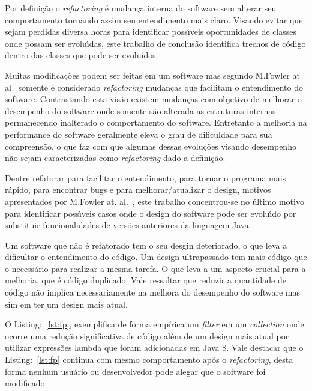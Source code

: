 Por defini\c{c}\~{a}o o \textit{refactoring} \'{e} mudan\c{c}a interna do software sem alterar seu comportamento tornando assim seu entendimento mais claro. Visando evitar que sejam perdidas diversa horas para identificar poss\'{\i}veis oportunidades de classes onde possam ser evolu\'{\i}das, este trabalho de conclus\~{a}o identifica trechos de c\'{o}digo dentro das classes que pode ser evolu\'{i}dos.

Muitas modifica\c{c}\~{o}es podem ser feitas em um software mas segundo M.Fowler at al~\cite{martinFowlerRafactoring} somente \'{e} considerado \textit{refactoring} mudan\c{c}as que facilitam o entendimento do software. Contrastando esta vis\~{a}o existem mudan\c{c}as com objetivo de melhorar o desempenho do software onde somente s\~{a}o alterada as estruturas internas permanecendo inalterado o comportamento do software. Entretanto a melhoria na performance do software geralmente eleva o grau de dificuldade para sua compreens\~{a}o, o que faz com que algumas dessas evolu\c{c}\~{o}es visando desempenho n\~{a}o sejam caracterizadas como \textit{refactoring} dado a defini\c{c}\~{a}o.

Dentre refatorar para facilitar o entendimento, para tornar o programa mais r\'{a}pido, para encontrar bugs e para melhorar/atualizar o design, motivos apresentados por M.Fowler at. al.~\cite{martinFowlerRafactoring}, este trabalho concentrou-se no \'{u}ltimo motivo para identificar poss\'{\i}veis casos onde o design do software pode ser evolu\'{\i}do por substituir funcionalidades de vers\~{o}es anteriores da linguagem Java.

Um software que n\~{a}o \'{e} refatorado tem o seu desgin deteriorado, o que leva a dificultar o entendimento do c\'{o}digo. Um design ultrapassado tem mais c\'{o}digo que o necess\'{a}rio para realizar a mesma tarefa. O que leva a um aspecto crucial para a melhoria, que \'{e} código duplicado. Vale ressaltar que reduzir a quantidade de c\'{o}digo n\~{a}o impl\'{i}ca necessariamente na melhora do desempenho do software mas sim em ter um design mais atual.

O Listing:~\ref{lst:fp}, exemplifica de forma emp\'{i}rica um {\it filter} em um {\it collection} onde ocorre uma redu\c{c}\~{a}o significativa de c\'{o}digo al\'{e}m de um design mais atual por utilizar express\~{o}es lambda que foram adicionadas em Java 8. Vale destacar que o Listing:~\ref{lst:fp} continua com mesmo comportamento ap\'{o}s o \textit{refactoring}, desta forma nenhum usu\'{a}rio ou desenvolvedor pode alegar que o software foi modificado.


